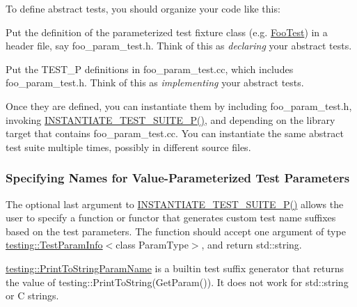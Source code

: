 To define abstract tests, you should organize your code like this\+:


\begin{DoxyEnumerate}
\item Put the definition of the parameterized test fixture class (e.\+g. {\ttfamily \mbox{\hyperlink{class_foo_test}{Foo\+Test}}}) in a header file, say {\ttfamily foo\+\_\+param\+\_\+test.\+h}. Think of this as {\itshape declaring} your abstract tests.
\end{DoxyEnumerate}
\begin{DoxyEnumerate}
\item Put the {\ttfamily T\+E\+S\+T\+\_\+P} definitions in {\ttfamily foo\+\_\+param\+\_\+test.\+cc}, which includes {\ttfamily foo\+\_\+param\+\_\+test.\+h}. Think of this as {\itshape implementing} your abstract tests.
\end{DoxyEnumerate}

Once they are defined, you can instantiate them by including {\ttfamily foo\+\_\+param\+\_\+test.\+h}, invoking {\ttfamily \mbox{\hyperlink{googletest-master_2googletest_2include_2gtest_2gtest-param-test_8h_a6a5cb3ce0a0fe17f84f357a6f39a4ba5}{I\+N\+S\+T\+A\+N\+T\+I\+A\+T\+E\+\_\+\+T\+E\+S\+T\+\_\+\+S\+U\+I\+T\+E\+\_\+\+P()}}}, and depending on the library target that contains {\ttfamily foo\+\_\+param\+\_\+test.\+cc}. You can instantiate the same abstract test suite multiple times, possibly in different source files.

\subsubsection*{Specifying Names for Value-\/\+Parameterized Test Parameters}

The optional last argument to {\ttfamily \mbox{\hyperlink{googletest-master_2googletest_2include_2gtest_2gtest-param-test_8h_a6a5cb3ce0a0fe17f84f357a6f39a4ba5}{I\+N\+S\+T\+A\+N\+T\+I\+A\+T\+E\+\_\+\+T\+E\+S\+T\+\_\+\+S\+U\+I\+T\+E\+\_\+\+P()}}} allows the user to specify a function or functor that generates custom test name suffixes based on the test parameters. The function should accept one argument of type {\ttfamily \mbox{\hyperlink{structtesting_1_1_test_param_info}{testing\+::\+Test\+Param\+Info}}$<$class Param\+Type$>$}, and return {\ttfamily std\+::string}.

{\ttfamily \mbox{\hyperlink{structtesting_1_1_print_to_string_param_name}{testing\+::\+Print\+To\+String\+Param\+Name}}} is a builtin test suffix generator that returns the value of {\ttfamily testing\+::\+Print\+To\+String(\+Get\+Param())}. It does not work for {\ttfamily std\+::string} or C strings.

